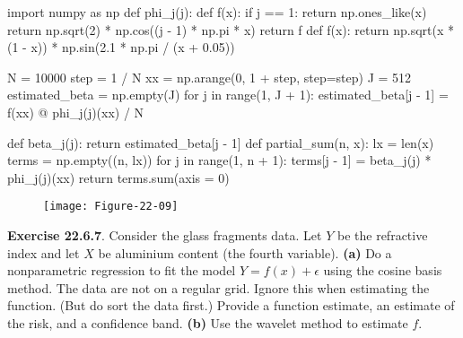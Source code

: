 \begin{python}
import numpy as np
def phi_{j}(j):
    def f(x):
        if j == 1:
            return np.ones_like(x)
        return np.sqrt(2) * np.cos((j - 1) * np.pi * x)
    return f
def f(x):
    return np.sqrt(x * (1 - x)) * np.sin(2.1 * np.pi / (x + 0.05))
\end{python}

\begin{python}
N = 10000
step = 1 / N
xx = np.arange(0, 1 + step, step=step)
J = 512
estimated_beta = np.empty(J)
for j in range(1, J + 1):
    estimated_beta[j - 1] = f(xx) @ phi_{j}(j)(xx) / N
    
def beta_{j}(j):
    return estimated_beta[j - 1]
def partial_sum(n, x):
    lx = len(x)
    terms = np.empty((n, lx))
    for j in range(1, n + 1):
        terms[j - 1] = beta_{j}(j) * phi_{j}(j)(xx)
    return terms.sum(axis = 0)
\end{python}


\begin{figure}[H]
\centering
\texttt{[image: Figure-22-09]}
\end{figure}


\textbf{Exercise 22.6.7}. Consider the glass fragments data. Let \(Y\)
be the refractive index and let \(X\) be aluminium content (the fourth
variable).
\textbf{(a)} Do a nonparametric regression to fit the model
\(Y = f(x) + \epsilon\) using the cosine basis method. The data are not
on a regular grid. Ignore this when estimating the function. (But do
sort the data first.) Provide a function estimate, an estimate of the
risk, and a confidence band.
\textbf{(b)} Use the wavelet method to estimate \(f\).

